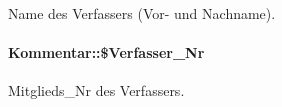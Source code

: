 Name des Verfassers (Vor- und Nachname). 

\hypertarget{classKommentar_c92b002e40690ee052fec446ff2a0ef6}{
\paragraph[\$Verfasser\_\-Nr]{\setlength{\rightskip}{0pt plus 5cm}Kommentar::\$Verfasser\_\-Nr}\hfill}
\label{classKommentar_c92b002e40690ee052fec446ff2a0ef6}


Mitglieds\_\-Nr des Verfassers. 

